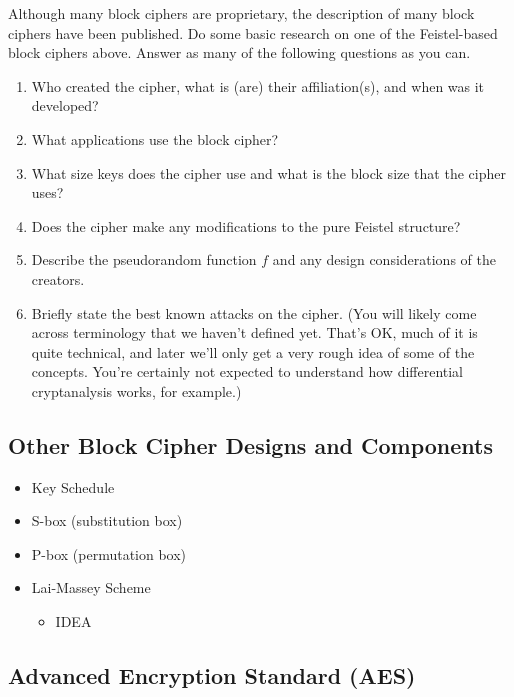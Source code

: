 \begin{problem}  [20 points]
Although many block ciphers are proprietary, the description of many block ciphers have been published. Do some basic research on one of the Feistel-based block ciphers above. Answer as many of the following questions as you can.
	\begin{enumerate}
		\item Who created the cipher, what is (are) their affiliation(s), and when was it developed?
		\item What applications use the block cipher?
		\item What size keys does the cipher use and what is the block size that the cipher uses?
		\item Does the cipher make any modifications to the pure Feistel structure?
		\item Describe the pseudorandom function $f$ and any design considerations of the creators.
		\item Briefly state the best known attacks on the cipher. (You will likely come across terminology that we haven't defined yet. That's OK, much of it is quite technical, and later we'll only get a very rough idea of some of the concepts. You're certainly not expected to understand how differential cryptanalysis works, for example.)
	\end{enumerate}
\end{problem}

		\subsection{Other Block Cipher Designs and Components}

		\begin{itemize}
			\item Key Schedule
			\item S-box (substitution box)
			\item P-box (permutation box)
			\item Lai-Massey Scheme
			\begin{itemize}
				\item IDEA
			\end{itemize}
		\end{itemize}

		\subsection{Advanced Encryption Standard (AES)}

